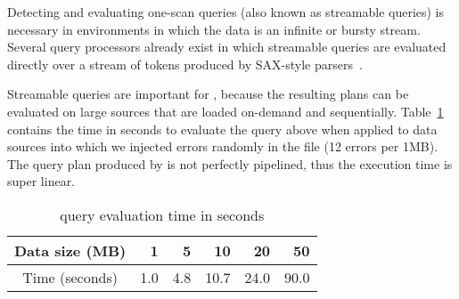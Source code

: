 Detecting and evaluating one-scan queries (also known as streamable
queries) is
necessary in \Xml{} environments in which the \Xml{} data is an
infinite or bursty stream.  Several query processors already exist in
which streamable queries are evaluated directly over a stream of
tokens produced by SAX-style
parsers~\cite{DBLP:journals/vldb/FlorescuHKLRWCS04,rose:villard:2005}.

Streamable queries are important for \padx{}, because the resulting
plans can be evaluated on large \pads{} sources that are loaded
on-demand and sequentially.  Table~\ref{tab:linear} contains the time
in seconds to evaluate the query above when applied to \pads{} data
sources into which we injected errors randomly in the file
(12 errors per 1MB).  The query plan produced
by \Galax{} is not perfectly pipelined, thus the execution time is super
linear.  

\begin{table}
\begin{center}
\begin{tabular}{c|r|r|r|r|r}
Data size (MB) & 1  & 5 & 10 & 20 & 50  \\ \hline
Time (seconds) & 1.0 & 4.8 & 10.7 & 24.0 & 90.0 \\
\end{tabular}
\end{center}
\caption{\padx{} query evaluation time in seconds}
\label{tab:linear}
\end{table}

